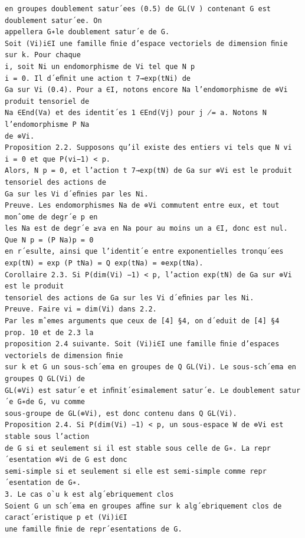 \documentclass[10pt]{article}
\begin{document}
\begin{verbatim}
en groupes doublement satur´ees (0.5) de GL(V ) contenant G est doublement satur´ee. On
appellera G∗le doublement satur´e de G.
Soit (Vi)i∈I une famille ﬁnie d’espace vectoriels de dimension ﬁnie sur k. Pour chaque
i, soit Ni un endomorphisme de Vi tel que N p
i = 0. Il d´eﬁnit une action t 7→exp(tNi) de
Ga sur Vi (0.4). Pour a ∈I, notons encore Na l’endomorphisme de ⊗Vi produit tensoriel de
Na ∈End(Va) et des identit´es 1 ∈End(Vj) pour j ̸= a. Notons N l’endomorphisme P Na
de ⊗Vi.
Proposition 2.2. Supposons qu’il existe des entiers vi tels que N vi
i = 0 et que P(vi−1) < p.
Alors, N p = 0, et l’action t 7→exp(tN) de Ga sur ⊗Vi est le produit tensoriel des actions de
Ga sur les Vi d´eﬁnies par les Ni.
Preuve. Les endomorphismes Na de ⊗Vi commutent entre eux, et tout monˆome de degr´e p en
les Na est de degr´e ≥va en Na pour au moins un a ∈I, donc est nul. Que N p = (P Na)p = 0
en r´esulte, ainsi que l’identit´e entre exponentielles tronqu´ees
exp(tN) = exp (P tNa) = Q exp(tNa) = ⊗exp(tNa).
Corollaire 2.3. Si P(dim(Vi) −1) < p, l’action exp(tN) de Ga sur ⊗Vi est le produit
tensoriel des actions de Ga sur les Vi d´eﬁnies par les Ni.
Preuve. Faire vi = dim(Vi) dans 2.2.
Par les mˆemes arguments que ceux de [4] §4, on d´eduit de [4] §4 prop. 10 et de 2.3 la
proposition 2.4 suivante. Soit (Vi)i∈I une famille ﬁnie d’espaces vectoriels de dimension ﬁnie
sur k et G un sous-sch´ema en groupes de Q GL(Vi). Le sous-sch´ema en groupes Q GL(Vi) de
GL(⊕Vi) est satur´e et inﬁnit´esimalement satur´e. Le doublement satur´e G∗de G, vu comme
sous-groupe de GL(⊕Vi), est donc contenu dans Q GL(Vi).
Proposition 2.4. Si P(dim(Vi) −1) < p, un sous-espace W de ⊗Vi est stable sous l’action
de G si et seulement si il est stable sous celle de G∗. La repr´esentation ⊗Vi de G est donc
semi-simple si et seulement si elle est semi-simple comme repr´esentation de G∗.
3. Le cas o`u k est alg´ebriquement clos
Soient G un sch´ema en groupes aﬃne sur k alg´ebriquement clos de caract´eristique p et (Vi)i∈I
une famille ﬁnie de repr´esentations de G.


\end{verbatim}
\end{document}

